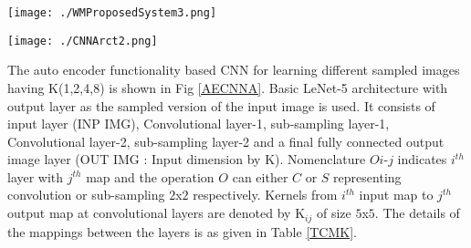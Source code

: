 \begin{figure*}
\centering
\texttt{[image: ./WMProposedSystem3.png]}
\caption{Proposed Model}
\label{PMWM}
\end{figure*}

\begin{figure*}
\centering
\texttt{[image: ./CNNArct2.png]}
\caption{Auto Encoder-CNN (ACNN) Architecture}
\label{AECNNA}
\end{figure*}

The auto encoder functionality based CNN for learning different sampled images having K(1,2,4,8) is shown in Fig \ref{AECNNA}.  Basic LeNet-5 architecture with output layer as the sampled version of the input image is used. It consists of input layer (INP IMG), Convolutional layer-1, sub-sampling layer-1, Convolutional layer-2, sub-sampling layer-2 and a final fully connected output image layer (OUT IMG : Input dimension by K). Nomenclature $Oi$-$j$ indicates $i^{th}$ layer with $j^{th}$ map and the operation $O$ can either $C$ or $S$ representing convolution or sub-sampling $2$x$2$ respectively. Kernels from $i^{th}$ input map to $j^{th}$ output map at convolutional layers are denoted by $\text{K}_{ij}$ of size $5$x$5$. The details of the mappings between the layers is as given in Table \ref{TCMK}. \\



